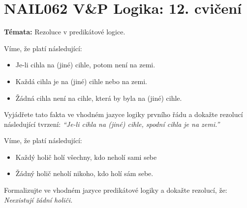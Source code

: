 \documentclass[a4paper,12pt]{article}
\begin{document}
\section*{NAIL062 V\&P Logika: 12. cvičení}


\textbf{Témata:}
Rezoluce v predikátové logice.



\medskip\begin{problem} Víme, že platí následující:
    \begin{itemize}\it
        \item Je-li cihla na (jiné) cihle, potom není na zemi.
        \item Každá cihla je na (jiné) cihle nebo na zemi.
        \item Žádná cihla není na cihle, která by byla na (jiné) cihle.
    \end{itemize}
    Vyjádřete tato fakta ve vhodném jazyce logiky prvního řádu a dokažte rezolucí následující tvrzení: {\it ``Je-li cihla na (jiné) cihle, spodní cihla je na zemi.''}
\end{problem}
        
    
\medskip\begin{problem} Víme, že platí následující:
    \begin{itemize}\it
        \item Každý holič holí všechny, kdo neholí sami sebe
        \item Žádný holič neholí nikoho, kdo holí sám sebe.
    \end{itemize}
    Formalizujte ve vhodném jazyce predikátové logiky a dokažte rezolucí, že: {\it Neexistují žádní holiči.}
\end{problem}
\end{document}
